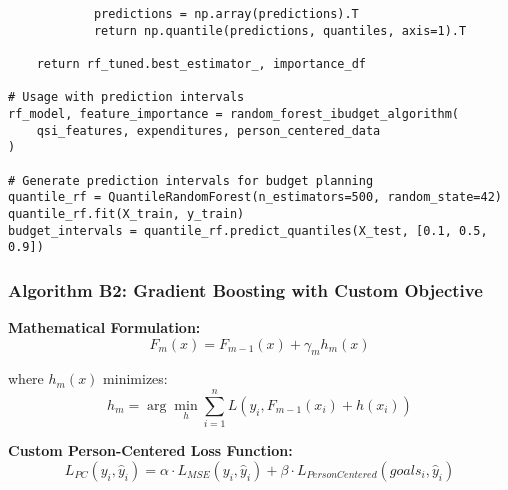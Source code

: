 \begin{lstlisting}
            predictions = np.array(predictions).T
            return np.quantile(predictions, quantiles, axis=1).T
    
    return rf_tuned.best_estimator_, importance_df

# Usage with prediction intervals
rf_model, feature_importance = random_forest_ibudget_algorithm(
    qsi_features, expenditures, person_centered_data
)

# Generate prediction intervals for budget planning
quantile_rf = QuantileRandomForest(n_estimators=500, random_state=42)
quantile_rf.fit(X_train, y_train)
budget_intervals = quantile_rf.predict_quantiles(X_test, [0.1, 0.5, 0.9])
\end{lstlisting}

\subsubsection{Algorithm B2: Gradient Boosting with Custom Objective}

\textbf{Mathematical Formulation:}
\begin{equation}
F_m(x) = F_{m-1}(x) + \gamma_m h_m(x)
\end{equation}

where $h_m(x)$ minimizes:
\begin{equation}
h_m = \arg\min_h \sum_{i=1}^{n} L(y_i, F_{m-1}(x_i) + h(x_i))
\end{equation}

\textbf{Custom Person-Centered Loss Function:}
\begin{equation}
L_{PC}(y_i, \hat{y}_i) = \alpha \cdot L_{MSE}(y_i, \hat{y}_i) + \beta \cdot L_{PersonCentered}(goals_i, \hat{y}_i)
\end{equation}

